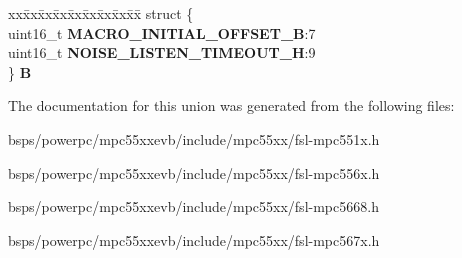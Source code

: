 \begin{DoxyCompactItemize}
\begin{tabbing}
\end{tabbing}\item 
\mbox{\label{unionuPCR16_a87c2abb7edabba230a3b12e7ff76383d}} 
\begin{tabbing}
xx\=xx\=xx\=xx\=xx\=xx\=xx\=xx\=xx\=\kill
struct \{\\
\>uint16\_t {\bfseries MACRO\_INITIAL\_OFFSET\_B}:7\\
\>uint16\_t {\bfseries NOISE\_LISTEN\_TIMEOUT\_H}:9\\
\} {\bfseries B}\\

\end{tabbing}\end{DoxyCompactItemize}


The documentation for this union was generated from the following files\+:\begin{DoxyCompactItemize}
\item 
bsps/powerpc/mpc55xxevb/include/mpc55xx/fsl-\/mpc551x.\+h\item 
bsps/powerpc/mpc55xxevb/include/mpc55xx/fsl-\/mpc556x.\+h\item 
bsps/powerpc/mpc55xxevb/include/mpc55xx/fsl-\/mpc5668.\+h\item 
bsps/powerpc/mpc55xxevb/include/mpc55xx/fsl-\/mpc567x.\+h\end{DoxyCompactItemize}
